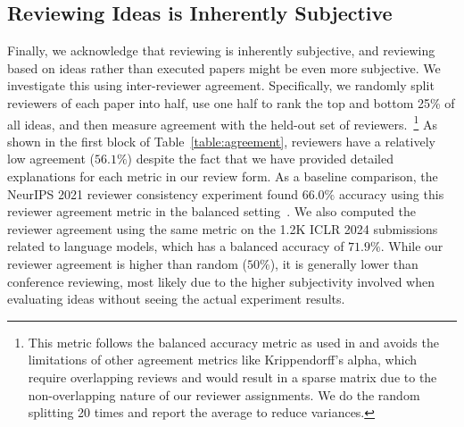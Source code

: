 \subsection{Reviewing Ideas is Inherently Subjective}
Finally, we acknowledge that reviewing is inherently subjective, and reviewing based on ideas rather than executed papers might be even more subjective. We investigate this using inter-reviewer agreement. 
Specifically, we randomly split reviewers of each paper into half, use one half to rank the top and bottom 25\% of all ideas, and then measure agreement with the held-out set of reviewers.~\footnote{This metric follows the balanced accuracy metric as used in \citet{AIScientist} and avoids the limitations of other agreement metrics like Krippendorff's alpha, which require overlapping reviews and would result in a sparse matrix due to the non-overlapping nature of our reviewer assignments. We do the random splitting 20 times and report the average to reduce variances.}
As shown in the first block of Table~\ref{table:agreement}, reviewers have a relatively low agreement ($56.1\%$) despite the fact that we have provided detailed explanations for each metric in our review form.
As a baseline comparison, the NeurIPS 2021 reviewer consistency experiment found $66.0\%$ accuracy using this reviewer agreement metric in the balanced setting~\cite{beygelzimer2021neurips,AIScientist}. 
We also computed the reviewer agreement using the same metric on the 1.2K ICLR 2024 submissions related to language models, which has a balanced accuracy of $71.9\%$. 
While our reviewer agreement is higher than random ($50\%$), it is generally lower than conference reviewing, most likely due to the higher subjectivity involved when evaluating ideas without seeing the actual experiment results. 




